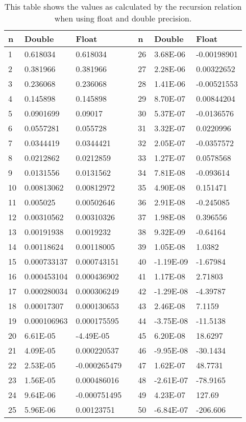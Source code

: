 \documentclass[11pt]{article} %
\begin{document}
		\begin{table}[h]
			\centering
			\begin{tabular}{l|l|l||l||l|l|l}
				n & Double & Float && n & Double & Float \\ \hline \hline
				1 & 0.618034 & 0.618034 && 26 & 3.68E-06 & -0.00198901\\
				2 & 0.381966 & 0.381966  && 27 & 2.28E-06 & 0.00322652\\
				3 & 0.236068 & 0.236068 && 28 & 1.41E-06 & -0.00521553\\
				4 & 0.145898 & 0.145898 && 29 & 8.70E-07 & 0.00844204\\
				5 & 0.0901699 & 0.09017 && 30 & 5.37E-07 & -0.0136576\\
				6 & 0.0557281 & 0.055728 && 31 & 3.32E-07 & 0.0220996\\
				7 & 0.0344419 & 0.0344421 && 32 & 2.05E-07 & -0.0357572\\
				8 & 0.0212862 & 0.0212859 && 33 & 1.27E-07 & 0.0578568\\
				9 & 0.0131556 & 0.0131562 && 34 & 7.81E-08 & -0.093614\\
				10 & 0.00813062 & 0.00812972 && 35 & 4.90E-08 & 0.151471\\
				11 & 0.005025 & 0.00502646 && 36 & 2.91E-08 & -0.245085\\
				12 & 0.00310562 & 0.00310326 && 37 & 1.98E-08 & 0.396556\\
				13 & 0.00191938 & 0.0019232 && 38 & 9.32E-09 & -0.64164\\
				14 & 0.00118624 & 0.00118005 && 39 & 1.05E-08 & 1.0382\\
				15 & 0.000733137 & 0.000743151 && 40 & -1.19E-09 & -1.67984\\
				16 & 0.000453104 & 0.000436902 && 41 & 1.17E-08 & 2.71803\\
				17 & 0.000280034 & 0.000306249 && 42 & -1.29E-08 & -4.39787\\
				18 & 0.00017307 & 0.000130653 && 43 & 2.46E-08 & 7.1159\\
				19 & 0.000106963 & 0.000175595 && 44 & -3.75E-08 & -11.5138\\
				20 & 6.61E-05 & -4.49E-05 && 45 & 6.20E-08 & 18.6297\\
				21 & 4.09E-05 & 0.000220537 && 46 & -9.95E-08 & -30.1434\\
				22 & 2.53E-05 & -0.000265479 && 47 & 1.62E-07 & 48.7731\\
				23 & 1.56E-05 & 0.000486016 && 48 & -2.61E-07 & -78.9165\\
				24 & 9.64E-06 & -0.000751495 && 49 & 4.23E-07 & 127.69\\
				25 & 5.96E-06 & 0.00123751 && 50 & -6.84E-07 & -206.606
			\end{tabular}
			\caption{This table shows the values as calculated by the recursion relation when using float and double precision.}
			\label{tab:myfirsttable}
		\end{table}
\end{document}
